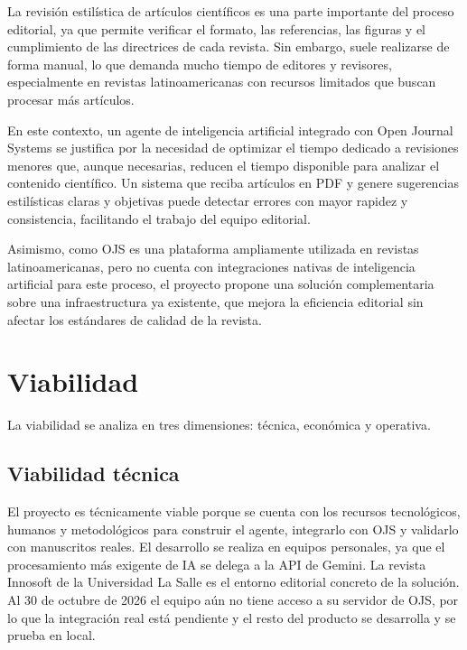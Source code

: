 La revisión estilística de artículos científicos es una parte importante del proceso editorial, ya que permite verificar el formato, las referencias, las figuras y el cumplimiento de las directrices de cada revista. Sin embargo, suele realizarse de forma manual, lo que demanda mucho tiempo de editores y revisores, especialmente en revistas latinoamericanas con recursos limitados que buscan procesar más artículos.

En este contexto, un agente de inteligencia artificial integrado con Open Journal Systems se justifica por la necesidad de optimizar el tiempo dedicado a revisiones menores que, aunque necesarias, reducen el tiempo disponible para analizar el contenido científico. Un sistema que reciba artículos en PDF y genere sugerencias estilísticas claras y objetivas puede detectar errores con mayor rapidez y consistencia, facilitando el trabajo del equipo editorial.

Asimismo, como OJS es una plataforma ampliamente utilizada en revistas latinoamericanas, pero no cuenta con integraciones nativas de inteligencia artificial para este proceso, el proyecto propone una solución complementaria sobre una infraestructura ya existente, que mejora la eficiencia editorial sin afectar los estándares de calidad de la revista.

\section{Viabilidad}

La viabilidad se analiza en tres dimensiones: técnica, económica y operativa.

\subsection{Viabilidad técnica}

El proyecto es técnicamente viable porque se cuenta con los recursos tecnológicos, humanos y metodológicos para construir el agente, integrarlo con OJS y validarlo con manuscritos reales. El desarrollo se realiza en equipos personales, ya que el procesamiento más exigente de IA se delega a la API de Gemini. La revista Innosoft de la Universidad La Salle es el entorno editorial concreto de la solución. Al 30 de octubre de 2026 el equipo aún no tiene acceso a su servidor de OJS, por lo que la integración real está pendiente y el resto del producto se desarrolla y se prueba en local.

